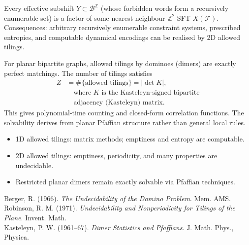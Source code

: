 \begin{technical}
Every effective subshift $Y\subset\mathcal{B}^{\mathbb{Z}}$ (whose forbidden words form a recursively enumerable set) is a factor of some nearest-neighbour $\mathbb{Z}^2$ SFT $X(\mathcal{F})$.  
Consequences: arbitrary recursively enumerable constraint systems, prescribed entropies, and computable dynamical encodings can be realised by 2D allowed tilings.

For planar bipartite graphs, allowed tilings by dominoes (dimers) are exactly perfect matchings. The number of tilings satisfies
\begin{align*}
Z &= \#\{\text{allowed tilings}\} = |\det K|, \\
    &\quad \text{where } K \text{ is the Kasteleyn-signed bipartite}\\
    &\quad \text{adjacency (Kasteleyn) matrix.}
\end{align*}
This gives polynomial-time counting and closed-form correlation functions.  
The solvability derives from planar Pfaffian structure rather than general local rules.

\vspace{0.5em}
\begin{itemize}\itemsep0.2em
\item 1D allowed tilings: matrix methods; emptiness and entropy are computable.
\item 2D allowed tilings: emptiness, periodicity, and many properties are undecidable.
\item Restricted planar dimers remain exactly solvable via Pfaffian techniques.
\end{itemize}

\techref
{\footnotesize
Berger, R. (1966). \textit{The Undecidability of the Domino Problem}. Mem. AMS.\\
Robinson, R. M. (1971). \textit{Undecidability and Nonperiodicity for Tilings of the Plane}. Invent. Math.\\
Kasteleyn, P. W. (1961–67). \textit{Dimer Statistics and Pfaffians}. J. Math. Phys., Physica.
}
\end{technical}
